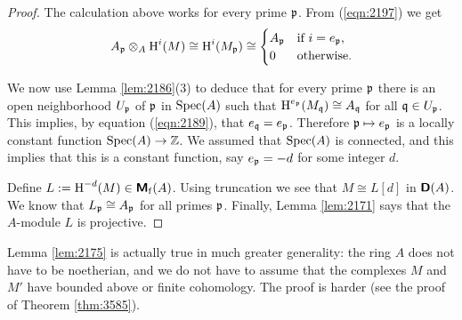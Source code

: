 \begin{proof}
The calculation above works for every prime $\mathfrak{p}$. 
From (\ref{eqn:2197}) we get 
\begin{equation} \label{eqn:2189}
A_{\mathfrak{p}} \otimes_A \operatorname{H}^i(M) \cong \operatorname{H}^i(M_{\mathfrak{p}}) \cong 
\begin{cases}
A_{\mathfrak{p}} & \textup{if} \ i = e_{\mathfrak{p}} , 
\\
0 & \textup{otherwise} . 
\end{cases}
\end{equation}

We now use Lemma \ref{lem:2186}(3) to deduce that for every prime $\mathfrak{p}$ there is 
an open neighborhood $U_{\mathfrak{p}}$ of $\mathfrak{p}$ in $\operatorname{Spec}(A)$ such that 
$\operatorname{H}^{e_{\mathfrak{p}}}(M_{\mathfrak{q}}) \cong A_{\mathfrak{q}}$ for all $\mathfrak{q} \in U_{\mathfrak{p}}$.
This implies, by equation (\ref{eqn:2189}), that 
$e_{\mathfrak{q}} = e_{\mathfrak{p}}$.  Therefore $\mathfrak{p} \mapsto e_{\mathfrak{p}}$ is a locally constant function
$\operatorname{Spec}(A) \to \mathbb{Z}$. We assumed that $\operatorname{Spec}(A)$ is connected, and this 
implies that this is a constant function, say $e_{\mathfrak{p}} = -d$ for some integer 
$d$. 

Define $L := \operatorname{H}^{-d}(M) \in \boldsymbol{\mathsf{M}}_{\mathrm{f}}(A)$. 
Using truncation we see that $M \cong L[d]$ in 
$\boldsymbol{\mathsf{D}}(A)$. We know that $L_{\mathfrak{p}} \cong A_{\mathfrak{p}}$ for all primes $\mathfrak{p}$. 
Finally, Lemma \ref{lem:2171} says that the $A$-module $L$ is projective. 
\end{proof}

\begin{rem} \label{rem:2185}
Lemma \ref{lem:2175} is actually true in much greater generality: 
the ring $A$ does not have to be noetherian, and we do not have to assume 
that the complexes $M$ and $M'$ have bounded above or finite cohomology. 
The proof is harder (see the proof of Theorem \ref{thm:3585}).
\end{rem}

